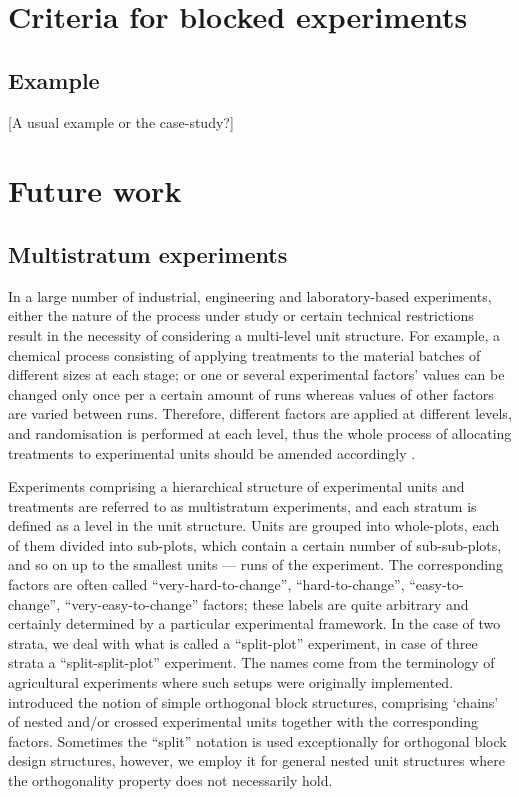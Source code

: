 \documentclass[11pt]{article}
\begin{document}
\section{Criteria for blocked experiments}
\label{ch::compound_blocked}


\subsection{Example}
[A usual example or the case-study?]
\section{Future work}
\subsection{Multistratum experiments}
In a large number of industrial, engineering and laboratory-based experiments, either the nature of the process under study or certain technical restrictions result in the necessity of considering a multi-level unit structure. For example, a chemical process consisting of applying treatments to the material batches of different sizes at each stage;  or one or several experimental factors' values can be changed only once per a certain amount of runs whereas values of other factors are varied between runs. Therefore, different factors are applied at different levels, and randomisation is performed at each level, thus the whole process of allocating treatments to experimental units should be amended accordingly \citep{MeadGilmour2012}.

Experiments comprising a hierarchical structure of experimental units and treatments are referred to as multistratum experiments, and each stratum is defined as a level in the unit structure. Units are grouped into whole-plots, each of them divided into sub-plots, which contain a certain number of sub-sub-plots, and so on up to the smallest units --- runs of the experiment. The corresponding factors are often called ``very-hard-to-change'', ``hard-to-change'', ``easy-to-change'', ``very-easy-to-change'' factors; these labels are quite arbitrary and certainly determined by a particular experimental framework. In the case of two strata, we deal with what is called a ``split-plot'' experiment, in case of three strata a ``split-split-plot'' experiment. The names come from the terminology of agricultural experiments where such setups were originally implemented. \cite{Nelder1965analysis} introduced the notion of simple orthogonal block structures, comprising `chains' of nested and/or crossed experimental units together with the corresponding factors. Sometimes the ``split'' notation is used exceptionally for orthogonal block design structures, however, we employ it for general nested unit structures where the orthogonality property does not necessarily hold.
\end{document}
